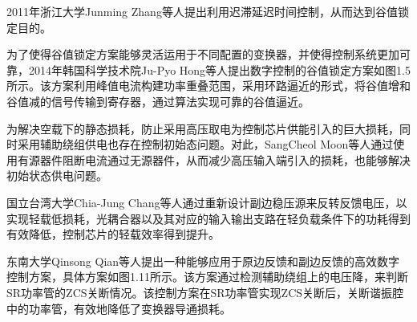 2011年浙江大学Junming Zhang等人提出利用迟滞延迟时间控制\cite{zhang2011_vallye_switch1}，从而达到谷值锁定目的。

为了使得谷值锁定方案能够灵活运用于不同配置的变换器，并使得控制系统更加可靠，2014年韩国科学技术院Ju-Pyo Hong等人提出数字控制的谷值锁定方案如图1.5所示\cite{hong2014_vallye_switch2}。该方案利用峰值电流构建功率重叠范围，采用环路逼近的形式，将谷值增和谷值减的信号传输到寄存器，通过算法实现可靠的谷值逼近。

为解决空载下的静态损耗，防止采用高压取电为控制芯片供能引入的巨大损耗，同时采用辅助绕组供电也存在控制初始态问题。对此，SangCheol Moon等人通过使用有源器件阻断电流通过无源器件，从而减少高压输入端引入的损耗，也能够解决初始状态供电问题\cite{moon2011new_static_loss1}。


国立台湾大学Chia-Jung Chang等人通过重新设计副边稳压源来反转反馈电压，以实现轻载低损耗\cite{chang2012_static_loss2}，光耦合器以及其对应的输入输出支路在轻负载条件下的功耗得到有效降低，控制芯片的轻载效率得到提升。

东南大学Qinsong Qian等人提出一种能够应用于原边反馈和副边反馈的高效数字控制方案\cite{qian2022high_ZCS1}，具体方案如图1.11所示。该方案通过检测辅助绕组上的电压降，来判断SR功率管的ZCS关断情况。该控制方案在SR功率管实现ZCS关断后，关断谐振腔中的功率管，有效地降低了变换器导通损耗。

